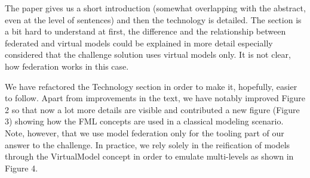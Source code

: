 \documentclass[10pt]{article}
\begin{document}
\begin{response}{The paper gives us a short introduction (somewhat overlapping with the abstract, even at the level of sentences) and then the technology is detailed. The section is a bit hard to understand at first, the difference and the relationship between federated and virtual models could be explained in more detail especially considered that the challenge solution uses virtual models only. It is not clear, how federation works in this case.}

We have refactored the Technology section in order to make it, hopefully, easier to follow. Apart from improvements in the text, we have notably improved Figure 2 so that now a lot more details are visible and contributed a new figure (Figure 3) showing how the FML concepts are used in a classical modeling scenario. Note, however, that we use model federation only for the tooling part of our answer to the challenge. In practice, we rely solely in the reification of models through the \textsf{VirtualModel} concept in order to emulate multi-levels as shown in Figure 4.%
\end{response}
\end{document}
